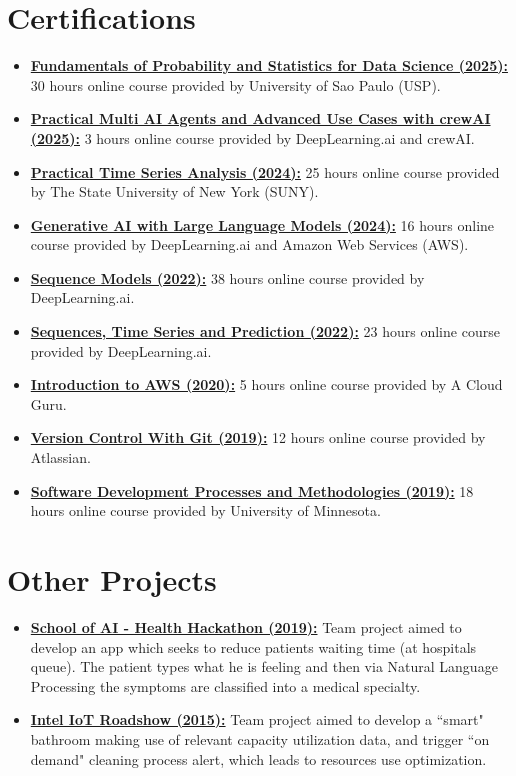 \documentclass[letterpaper,6pt]{article}
\newcommand{\resumeItem}[2]{
  \item\small{
    \textbf{#1}{ #2 \vspace{-2pt}}
  }
}
\newcommand{\resumeSubItem}[2]{\resumeItem{#1}{#2}\vspace{-4pt}}
\newcommand{\resumeSubHeadingListStart}{\begin{itemize}[leftmargin=*]}
\newcommand{\resumeSubHeadingListEnd}{\end{itemize}}
\begin{document}
\section{Certifications}
  \resumeSubHeadingListStart
    \resumeItem{\href{https://drive.google.com/file/d/1KvUsgIFlltR3SW48f4Pu1RNp0cE1g_y0/view?usp=sharing}{Fundamentals of Probability and Statistics for Data Science (2025):}}{30 hours online course provided by University of Sao Paulo (USP).}
    \resumeItem{\href{https://learn.deeplearning.ai/accomplishments/3db9d146-093c-4dea-bb10-35f1f4fcf390?usp=sharing}{Practical Multi AI Agents and Advanced Use Cases with crewAI (2025):}}{3 hours online course provided by DeepLearning.ai and crewAI.}
    \resumeItem{\href{https://coursera.org/share/236b7e6ee1cd2fe7d370d22032c9829b}{Practical Time Series Analysis (2024):}}{25 hours online course provided by The State University of New York (SUNY).}
    \resumeItem{\href{https://coursera.org/share/2c0b8bc9c80337baff021341eb7291f6}{Generative AI with Large Language Models (2024):}}{16 hours online course provided by DeepLearning.ai and Amazon Web Services (AWS).}
    \resumeItem{\href{https://coursera.org/share/bfeeaa2fdb5d0af4a6ae16bbea2308a5}{Sequence Models (2022):}}{38 hours online course provided by DeepLearning.ai.}
    \resumeItem{\href{https://coursera.org/share/26abd334d3e6eeb10cdef24a925c1a06}{Sequences, Time Series and Prediction (2022):}}{23 hours online course provided by DeepLearning.ai.}
    \resumeItem{\href{https://verify.acloud.guru/40ACAB21F4F9}{Introduction to AWS (2020):}}{5 hours online course provided by A Cloud Guru.}
    \resumeItem{\href{https://coursera.org/share/0f7a200acafda161712761aabc647fdf}{Version Control With Git (2019):}}{12 hours online course provided by Atlassian.}
    \resumeItem{\href{https://coursera.org/share/49e36f73ee5af2e58a65943a26848b88}{Software Development Processes and Methodologies (2019):}}{18 hours online course provided by University of Minnesota.}
  \resumeSubHeadingListEnd

\section{Other Projects}
  \resumeSubHeadingListStart
    \resumeSubItem{\href{https://github.com/bzamith/ID_Agile-HH}{School of AI - Health Hackathon (2019):}}{Team project aimed to develop an app which seeks to reduce patients waiting time (at hospitals queue). The patient types what he is feeling and then via Natural Language Processing the symptoms are classified into a medical specialty. }
    \resumeSubItem{\href{http://www.instructables.com/id/IoT-Smart-Bathroom/}{Intel IoT Roadshow (2015):}}{Team project aimed to develop a ``smart" bathroom making use of relevant capacity utilization data, and trigger ``on demand" cleaning process alert, which leads to resources use optimization.}
  \resumeSubHeadingListEnd
\end{document}
